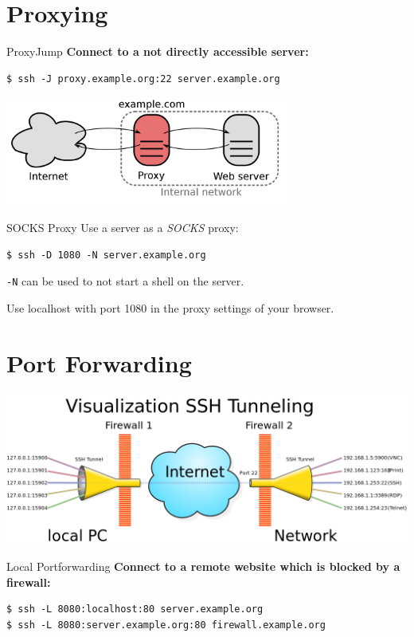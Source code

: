 \documentclass[10pt, graphics, aspectratio=169, table]{beamer}
\begin{document}
\section{Proxying}
\begin{frame}[fragile]{ProxyJump}
	\textbf{Connect to a not directly accessible server:}
	\begin{lstlisting}
$ ssh -J proxy.example.org:22 server.example.org
	\end{lstlisting}
	\begin{center}
		\includegraphics[width=0.7\textwidth]{img/proxy.png} \cite{proxy}
	\end{center}
\end{frame}

\begin{frame}[fragile]{SOCKS Proxy}
	Use a server as a \emph{SOCKS} proxy:
	\begin{lstlisting}
$ ssh -D 1080 -N server.example.org
	\end{lstlisting}
	\texttt{-N} can be used to not start a shell on the server.

	Use localhost with port 1080 in the proxy settings of your browser.
\end{frame}

\section{Port Forwarding}
\begin{frame}
	\includegraphics[width=\textwidth]{img/tunnel.png} \cite{tunnel}
\end{frame}

\begin{frame}[fragile]{Local Portforwarding}
	\textbf{Connect to a remote website which is blocked by a firewall:}
	\begin{lstlisting}
$ ssh -L 8080:localhost:80 server.example.org
$ ssh -L 8080:server.example.org:80 firewall.example.org
	\end{lstlisting}
\end{frame}
\end{document}
